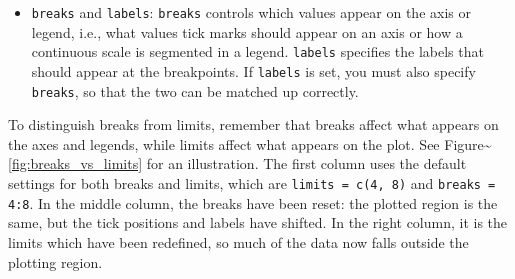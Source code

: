 \begin{itemize}
\itemsep1pt\parskip0pt
\item
  \texttt{breaks} and \texttt{labels}: \texttt{breaks} controls which
  values appear on the axis or legend, i.e., what values tick marks
  should appear on an axis or how a continuous scale is segmented in a
  legend. \texttt{labels} specifies the labels that should appear at the
  breakpoints. If \texttt{labels} is set, you must also specify
  \texttt{breaks}, so that the two can be matched up correctly.
    
\end{itemize}

To distinguish breaks from limits, remember that breaks affect what
appears on the axes and legends, while limits affect what appears on the
plot. See Figure\textasciitilde{}\ref{fig:breaks_vs_limits} for an
illustration. The first column uses the default settings for both breaks
and limits, which are \texttt{limits = c(4, 8)} and
\texttt{breaks = 4:8}. In the middle column, the breaks have been reset:
the plotted region is the same, but the tick positions and labels have
shifted. In the right column, it is the limits which have been
redefined, so much of the data now falls outside the plotting region.

\begin{Shaded}
\begin{Highlighting}[]
\StringTok{ } 
\StringTok{ }\NormalTok{(} \NormalTok{(}\NormalTok{, }\NormalTok{))}
\StringTok{ }\NormalTok{(} \NormalTok{(}\NormalTok{, }\NormalTok{))}
\StringTok{ }  
\StringTok{ }\NormalTok{(} \NormalTok{(}\NormalTok{, }\NormalTok{))}
\StringTok{ }\NormalTok{(} \NormalTok{(}\NormalTok{, }\NormalTok{))}
\end{Highlighting}
\end{Shaded}

